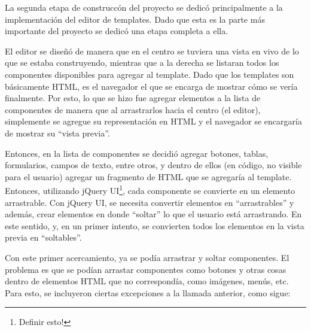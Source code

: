 \documentclass[12pt,titlepage,]{article}
\newenvironment{Shaded}{}{}
\newcommand{\KeywordTok}[1]{\textcolor[rgb]{0.00,0.44,0.13}{\textbf{{#1}}}}
\newcommand{\StringTok}[1]{\textcolor[rgb]{0.25,0.44,0.63}{{#1}}}
\newcommand{\CommentTok}[1]{\textcolor[rgb]{0.38,0.63,0.69}{\textit{{#1}}}}
\newcommand{\NormalTok}[1]{{#1}}
\begin{document}
La segunda etapa de construccón del proyecto se dedicó principalmente a
la implementación del editor de templates. Dado que esta es la parte más
importante del proyecto se dedicó una etapa completa a ella.

El editor se diseñó de manera que en el centro se tuviera una vista en
vivo de lo que se estaba construyendo, mientras que a la derecha se
listaran todos los componentes disponibles para agregar al template.
Dado que los templates son básicamente HTML, es el navegador el que se
encarga de mostrar cómo se vería finalmente. Por esto, lo que se hizo
fue agregar elementos a la lista de componentes de manera que al
arrastrarlos hacia el centro (el editor), simplemente se agregue su
representación en HTML y el navegador se encargaría de mostrar su
``vista previa''.

Entonces, en la lista de componentes se decidió agregar botones, tablas,
formularios, campos de texto, entre otros, y dentro de ellos (en código,
no visible para el usuario) agregar un fragmento de HTML que se
agregaría al template. Entonces, utilizando jQuery UI\footnote{Definir
  esto!}, cada componente se convierte en un elemento arrastrable. Con
jQuery UI, se necesita convertir elementos en ``arrastrables'' y además,
crear elementos en donde ``soltar'' lo que el usuario está arrastrando.
En este sentido, y, en un primer intento, se convierten todos los
elementos en la vista previa en ``soltables''.

\begin{Shaded}
\end{Shaded}

Con este primer acercamiento, ya se podía arrastrar y soltar
componentes. El problema es que se podían arrastar componentes como
botones y otras cosas dentro de elementos HTML que no correspondía, como
imágenes, menús, etc. Para esto, se incluyeron ciertas excepciones a la
llamada anterior, como sigue:

\begin{Shaded}
\end{Shaded}
\end{document}
